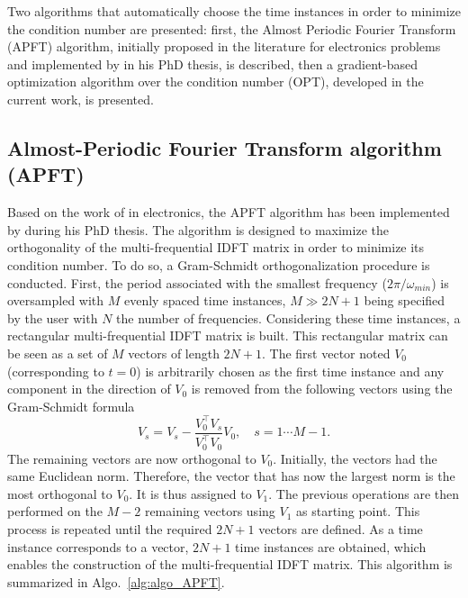 
Two algorithms that automatically choose the time instances in order to
minimize the condition number are presented: first, the Almost
Periodic Fourier Transform (APFT) algorithm, initially proposed in the
literature for electronics problems and implemented by
\citet{ThesisGuedeney} in his PhD thesis, is described, then a gradient-based
optimization algorithm over the condition number (OPT), developed in
the current work, is presented.

\subsection{Almost-Periodic Fourier Transform algorithm (APFT)}
\label{sec:apft_algorithm}
Based on the work of \citet{Kundert1988} in
electronics, the APFT
algorithm has been implemented by \citet{ThesisGuedeney} 
during his PhD thesis. The algorithm is designed
to maximize the orthogonality of the multi-frequential
IDFT matrix in order to minimize its condition number. To do so, a
Gram-Schmidt orthogonalization procedure is conducted.  First, the period 
associated with the smallest frequency ($2 \pi / \omega_{min}$) 
is oversampled with $M$ evenly spaced time
instances, $M\gg2N+1$ being specified by the user with $N$ the number of
frequencies. Considering these time instances, a rectangular
multi-frequential IDFT matrix is built. This rectangular matrix can be seen
as a set of $M$ vectors of length $2N+1$.
The first vector noted $V_0$ (corresponding
to $t=0$) is arbitrarily chosen as the first time instance and any
component in the direction of $V_0$ is removed from the following
vectors using the Gram-Schmidt formula
\begin{equation}
   V_s = V_s - \frac{V_0^\top V_s}{V_0^\top V_0} V_0, \quad s=1 \cdots M-1.
   \label{GramSchmidtAlgo}
\end{equation}
The remaining vectors are now orthogonal to $V_0$. 
Initially, the vectors had the same Euclidean norm.
Therefore, the vector that has now the largest norm is
the most orthogonal to $V_0$.
It is thus assigned to $V_1$. The previous
operations are then performed on the $M-2$ remaining vectors using $V_1$
as starting point. This process is repeated until the required $2N+1$ vectors
are defined. As a time instance corresponds to a vector, $2N+1$ time instances are obtained, 
which enables the construction of the multi-frequential
IDFT matrix. This algorithm is summarized in
Algo.~\ref{alg:algo_APFT}.

